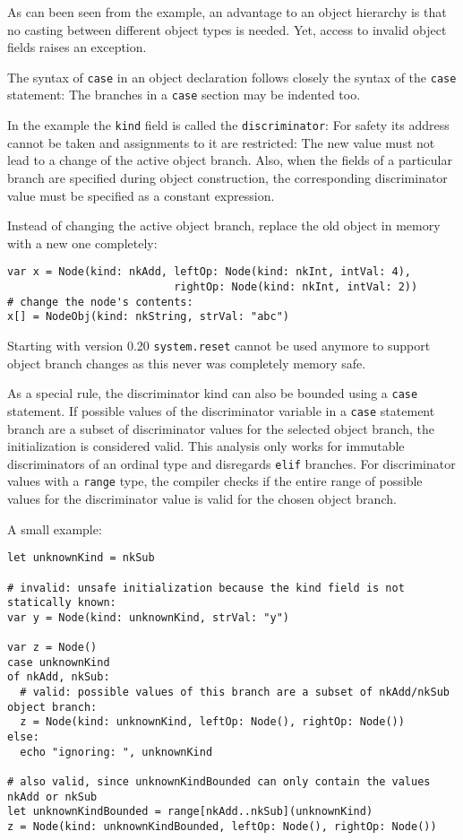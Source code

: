As can been seen from the example, an advantage to an object hierarchy
is that no casting between different object types is needed. Yet, access
to invalid object fields raises an exception.

The syntax of \texttt{case} in an object declaration follows closely the
syntax of the \texttt{case} statement: The branches in a \texttt{case}
section may be indented too.

In the example the \texttt{kind} field is called the
\texttt{discriminator}: For safety its address cannot be taken and
assignments to it are restricted: The new value must not lead to a
change of the active object branch. Also, when the fields of a
particular branch are specified during object construction, the
corresponding discriminator value must be specified as a constant
expression.

Instead of changing the active object branch, replace the old object in
memory with a new one completely:

\begin{verbatim}
var x = Node(kind: nkAdd, leftOp: Node(kind: nkInt, intVal: 4),
                          rightOp: Node(kind: nkInt, intVal: 2))
# change the node's contents:
x[] = NodeObj(kind: nkString, strVal: "abc")
\end{verbatim}

Starting with version 0.20 \texttt{system.reset} cannot be used anymore
to support object branch changes as this never was completely memory
safe.

As a special rule, the discriminator kind can also be bounded using a
\texttt{case} statement. If possible values of the discriminator
variable in a \texttt{case} statement branch are a subset of
discriminator values for the selected object branch, the initialization
is considered valid. This analysis only works for immutable
discriminators of an ordinal type and disregards \texttt{elif} branches.
For discriminator values with a \texttt{range} type, the compiler checks
if the entire range of possible values for the discriminator value is
valid for the chosen object branch.

A small example:

\begin{verbatim}
let unknownKind = nkSub

# invalid: unsafe initialization because the kind field is not statically known:
var y = Node(kind: unknownKind, strVal: "y")

var z = Node()
case unknownKind
of nkAdd, nkSub:
  # valid: possible values of this branch are a subset of nkAdd/nkSub object branch:
  z = Node(kind: unknownKind, leftOp: Node(), rightOp: Node())
else:
  echo "ignoring: ", unknownKind

# also valid, since unknownKindBounded can only contain the values nkAdd or nkSub
let unknownKindBounded = range[nkAdd..nkSub](unknownKind)
z = Node(kind: unknownKindBounded, leftOp: Node(), rightOp: Node())
\end{verbatim}

